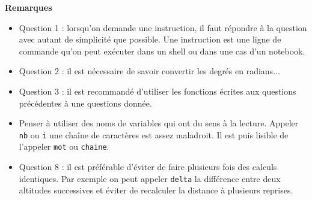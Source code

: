\documentclass[10pt,fleqn]{article} %
\begin{document}
\textbf{Remarques}
\begin{itemize}
\item Question 1 : lorsqu'on demande une instruction, il faut répondre à la question avec autant de simplicité que possible. Une instruction est une ligne de commande qu'on peut exécuter dans un shell ou dans une cas d'un notebook. 
\item Question 2 : il est nécessaire de savoir convertir les degrés en radians...
\item Question 3 : il est recommandé d'utiliser les fonctions écrites aux questions précédentes à une questions donnée. 
\item Penser à utiliser des noms de variables qui ont du sens à la lecture. Appeler \texttt{nb} ou \texttt{i} une chaîne de caractères est assez maladroit. Il est puis lisible de l'appeler \texttt{mot} ou \texttt{chaine}. 
\item Question 8 : il est préférable d'éviter de faire plusieurs fois des calculs identiques. Par exemple on peut appeler \texttt{delta} la différence entre deux altitudes successives et éviter de recalculer la distance à plusieurs reprises. 
\end{itemize}






%
\end{document}
